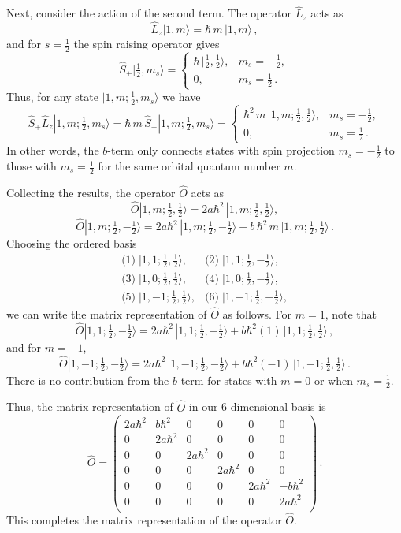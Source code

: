 \documentclass{article}
\begin{document}
Next, consider the action of the second term. The operator \(\hat{L}_z\) acts as
\[
\hat{L}_z|1,m\rangle = \hbar\,m\,|1,m\rangle\,,
\]
and for \(s=\tfrac{1}{2}\) the spin raising operator gives
\[
\hat{S}_+|\tfrac{1}{2},m_s\rangle =
\begin{cases}
\hbar\,|\tfrac{1}{2},\tfrac{1}{2}\rangle, & m_s=-\tfrac{1}{2},\\[1mm]
0, & m_s=\tfrac{1}{2}\,.
\end{cases}
\]
Thus, for any state \(|1,m; \tfrac{1}{2},m_s\rangle\) we have
\[
\hat{S}_+\hat{L}_z|1,m; \tfrac{1}{2},m_s\rangle = \hbar\,m\,\hat{S}_+|1,m; \tfrac{1}{2},m_s\rangle = 
\begin{cases}
\hbar^2\,m\,|1,m; \tfrac{1}{2},\tfrac{1}{2}\rangle, & m_s=-\tfrac{1}{2},\\[1mm]
0, & m_s=\tfrac{1}{2}\,.
\end{cases}
\]
In other words, the \(b\)-term only connects states with spin projection \(m_s=-\tfrac{1}{2}\) to those with \(m_s=\tfrac{1}{2}\) for the same orbital quantum number \(m\).

Collecting the results, the operator \(\hat{O}\) acts as
\[
\hat{O}|1,m;\tfrac{1}{2},\tfrac{1}{2}\rangle = 2a\hbar^2\,|1,m;\tfrac{1}{2},\tfrac{1}{2}\rangle,
\]
\[
\hat{O}|1,m;\tfrac{1}{2},-\tfrac{1}{2}\rangle = 2a\hbar^2\,|1,m;\tfrac{1}{2},-\tfrac{1}{2}\rangle + b\,\hbar^2\,m\,|1,m;\tfrac{1}{2},\tfrac{1}{2}\rangle\,.
\]
Choosing the ordered basis
\[
\begin{array}{lll}
\text{(1)}\; |1,1;\tfrac{1}{2},\tfrac{1}{2}\rangle, & \text{(2)}\; |1,1;\tfrac{1}{2},-\tfrac{1}{2}\rangle,\\[1mm]
\text{(3)}\; |1,0;\tfrac{1}{2},\tfrac{1}{2}\rangle, & \text{(4)}\; |1,0;\tfrac{1}{2},-\tfrac{1}{2}\rangle,\\[1mm]
\text{(5)}\; |1,-1;\tfrac{1}{2},\tfrac{1}{2}\rangle, & \text{(6)}\; |1,-1;\tfrac{1}{2},-\tfrac{1}{2}\rangle,
\end{array}
\]
we can write the matrix representation of \(\hat{O}\) as follows. For \(m=1\), note that
\[
\hat{O}|1,1;\tfrac{1}{2},-\tfrac{1}{2}\rangle = 2a\hbar^2\,|1,1;\tfrac{1}{2},-\tfrac{1}{2}\rangle + b\hbar^2 (1)\,|1,1;\tfrac{1}{2},\tfrac{1}{2}\rangle\,,
\]
and for \(m=-1\),
\[
\hat{O}|1,-1;\tfrac{1}{2},-\tfrac{1}{2}\rangle = 2a\hbar^2\,|1,-1;\tfrac{1}{2},-\tfrac{1}{2}\rangle + b\hbar^2 (-1)\,|1,-1;\tfrac{1}{2},\tfrac{1}{2}\rangle\,.
\]
There is no contribution from the \(b\)-term for states with \(m=0\) or when \(m_s=\tfrac{1}{2}\).

Thus, the matrix representation of \(\hat{O}\) in our 6-dimensional basis is
\[
\hat{O} =
\begin{pmatrix}
2a\hbar^2 & b\hbar^2 & 0 & 0 & 0 & 0 \\[1mm]
0 & 2a\hbar^2 & 0 & 0 & 0 & 0 \\[1mm]
0 & 0 & 2a\hbar^2 & 0 & 0 & 0 \\[1mm]
0 & 0 & 0 & 2a\hbar^2 & 0 & 0 \\[1mm]
0 & 0 & 0 & 0 & 2a\hbar^2 & -b\hbar^2 \\[1mm]
0 & 0 & 0 & 0 & 0 & 2a\hbar^2 \\
\end{pmatrix}\,.
\]
This completes the matrix representation of the operator \(\hat{O}\).
\end{document}
